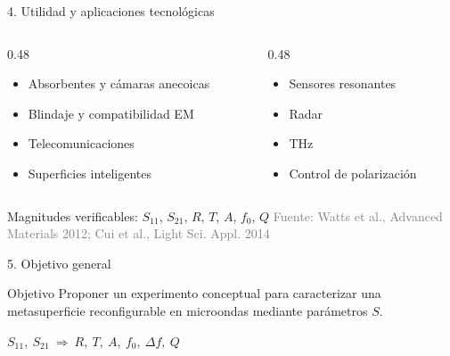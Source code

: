 \documentclass[aspectratio=169]{beamer}
\newcommand{\rubrica}[2]{\vspace{0.1cm}{\scriptsize\textcolor{deepblue}{Rúbrica #1 · #2}}}
\newcommand{\fuente}[1]{\vfill{\tiny\textcolor{gray}{Fuente: #1}}}
\begin{document}
\begin{frame}{4. Utilidad y aplicaciones tecnológicas}
  \Large
  \begin{columns}[T]
    \begin{column}{0.48\textwidth}
      \begin{itemize}
        \item Absorbentes y cámaras anecoicas
        \item Blindaje y compatibilidad EM
        \item Telecomunicaciones
        \item Superficies inteligentes
      \end{itemize}
    \end{column}
    \begin{column}{0.48\textwidth}
      \begin{itemize}
        \item Sensores resonantes
        \item Radar
        \item THz
        \item Control de polarización
      \end{itemize}
    \end{column}
  \end{columns}
  \vfill
  \centering\Large Magnitudes verificables: \(S_{11}\), \(S_{21}\), \(R\), \(T\), \(A\), \(f_0\), \(Q\)
  \fuente{Watts et al., Advanced Materials 2012; Cui et al., Light Sci. Appl. 2014}
  \rubrica{10}{Discusión de resultados}
\end{frame}

\begin{frame}{5. Objetivo general}
  \centering
  \begin{block}{Objetivo}
    \Large
    Proponer un experimento conceptual para caracterizar una metasuperficie reconfigurable en microondas mediante parámetros \(S\).
  \end{block}

  \vfill
  {\Huge\(S_{11},\ S_{21}\ \Longrightarrow\ R,\ T,\ A,\ f_0,\ \Delta f,\ Q\)}
  \rubrica{2}{Objetivos generales y específicos}
\end{frame}
\end{document}
